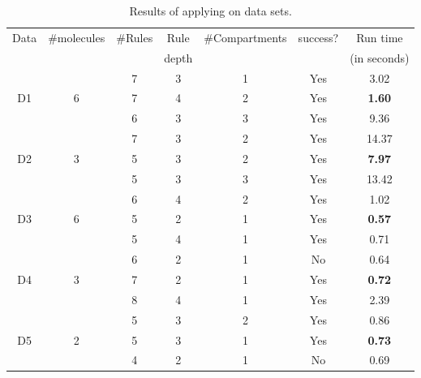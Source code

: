 \begin{table}[t]
  \centering
  \begin{tabular}[t]{|c|c|c|c|c|c|c|}\hline
    Data & \#molecules & \#Rules & Rule  & \#Compartments & success? & Run time \\
         &             &         & depth &               &          & (in seconds) \\\hline
         &   & 7  & 3 & 1 & Yes &  3.02 \\\cline{3-7}
    D1   & 6 & 7  & 4 & 2 & Yes & {\bf 1.60}  \\\cline{3-7}
         &   & 6  & 3 & 3 & Yes & 9.36  \\\hline
         
         &   & 7  & 3 & 2 & Yes & 14.37  \\\cline{3-7}
    D2   & 3 & 5  & 3 & 2 & Yes & {\bf 7.97}  \\\cline{3-7}
         &   & 5  & 3 & 3 & Yes  &  13.42 \\\hline
         
         &   & 6  & 4  & 2  & Yes & 1.02  \\\cline{3-7}
    D3   & 6 & 5  & 2 & 1 & Yes & {\bf 0.57}  \\\cline{3-7}
         &   & 5  & 4 & 1 & Yes  &  0.71 \\\hline
         
         &   & 6  & 2 & 1 & No &  0.64 \\\cline{3-7}
    D4   & 3 & 7  & 2 & 1 & Yes & {\bf 0.72}  \\\cline{3-7}
         &   & 8  & 4 & 1 & Yes  &  2.39 \\\hline
         
         &   & 5  & 3 & 2 & Yes &  0.86 \\\cline{3-7}
    D5   & 2 & 5  & 3 & 1 & Yes & {\bf 0.73}  \\\cline{3-7}
         &   & 4  & 2 & 1 & No  & 0.69  \\\hline
    


  \end{tabular}
  \caption{Results of applying \ourtool on data sets.
  }
  \label{tab:results}
\end{table}
